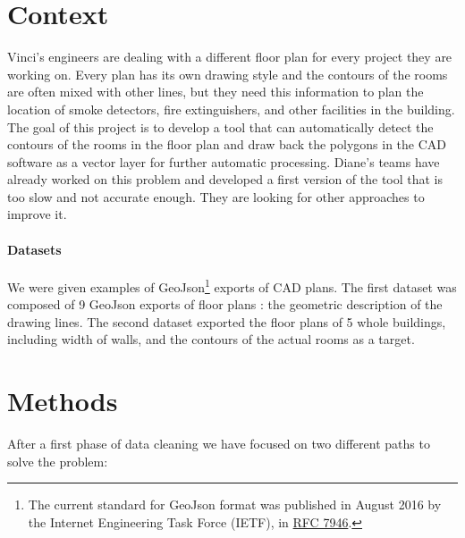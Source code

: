 \documentclass[11pt]{article}
\begin{document}
\section{Context}
Vinci's engineers are dealing with a different floor plan for every project they are working on.
Every plan has its own drawing style and the contours of the rooms are often mixed with other
lines, but they need this information to plan the location of smoke detectors, fire extinguishers,
and other facilities in the building. The goal of this project is to develop a tool that can
automatically detect the contours of the rooms in the floor plan and draw back the polygons in the CAD software as 
a vector layer for further automatic processing. 
Diane's teams have already worked on this problem and developed a first version of the tool
that is too slow and not accurate enough. They are looking for other approaches
to improve it.
\paragraph{Datasets}
We were given examples of GeoJson\footnote{The current standard for GeoJson format was 
published in August 2016 by the Internet Engineering Task Force (IETF), 
in \href{https://datatracker.ietf.org/doc/html/rfc7946}{RFC 7946}.} exports of CAD plans. The first dataset was 
composed of 9 GeoJson exports of floor plans :
the geometric description of the drawing lines. 
The second dataset exported the floor plans of 5 whole buildings, including width of walls, and
the contours of the actual rooms as a target.


\section{Methods}
\label{sec:methods}

\label{sec:methods}
After a first phase of data cleaning we have focused on two different paths to solve the problem:
\end{document}
